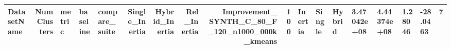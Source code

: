 \begin{tabular}{lrlllrrrrr}
\toprule
DatasetName & NumClusters & metric & baseline & compare_suite & Single_Inertia & Hybrid_Inertia & Rel_Inertia & Improvement_%
\midrule
SYNTH_C_80_F_120_n1000_000k_kmeans & 100 & Inertia & Single & Hybrid & 3.47042e+08 & 4.44374e+08 & 1.28046 & -28.0463 & 7 \\
\bottomrule
\end{tabular}
